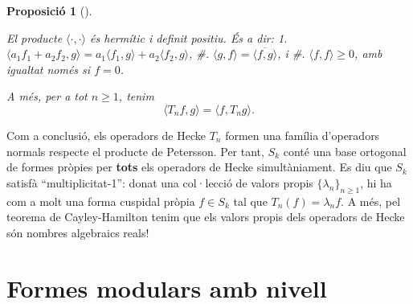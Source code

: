 \documentclass[
  letterpaper,
  DIV=11,
  numbers=noendperiod]{scrreprt}
\theoremstyle{plain}
\theoremstyle{plain}
\theoremstyle{definition}
\theoremstyle{plain}
\newtheorem{proposition}{Proposició}[chapter]
\theoremstyle{plain}
\theoremstyle{definition}
\theoremstyle{remark}
\begin{document}
\begin{proposition}[]\protect\hypertarget{prp-}{}\label{prp-}

El producte \(\langle\cdot,\cdot\rangle\) és hermític i definit positiu.
És a dir: 1.
\(\langle a_1f_1+a_2f_2,g\rangle = a_1\langle f_1,g\rangle + a_2\langle f_2,g\rangle\),
\#. \(\langle g,f\rangle = \overline{\langle f,g\rangle}\), i \#.
\(\langle f,f\rangle\geq 0\), amb igualtat només si \(f=0\).

A més, per a tot \(n\geq 1\), tenim \[
\langle T_n f, g\rangle=\langle f, T_ng\rangle.
\]

\end{proposition}

Com a conclusió, els operadors de Hecke \(T_n\) formen una família
d'operadors normals respecte el producte de Petersson. Per tant, \(S_k\)
conté una base ortogonal de formes pròpies per \textbf{tots} els
operadors de Hecke simultàniament. Es diu que \(S_k\) satisfà
``multiplicitat-1'': donat una col·lecció de valors propis
\(\{\lambda_n\}_{n\geq 1}\), hi ha com a molt una forma cuspidal pròpia
\(f\in S_k\) tal que \(T_n(f)=\lambda_n f\). A més, pel teorema de
Cayley-Hamilton tenim que els valors propis dels operadors de Hecke són
nombres algebraics reals!

\section{Formes modulars amb nivell}\label{formes-modulars-amb-nivell}
\end{document}
